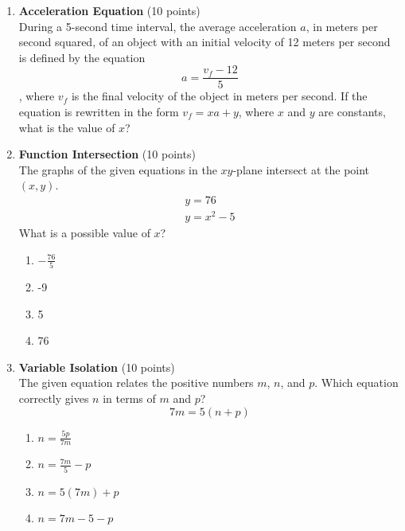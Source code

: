 \begin{enumerate}
  \item \textbf{Acceleration Equation} (10 points)\\
  During a 5-second time interval, the average acceleration $a$, in 
  meters per second squared, of an object with an initial velocity 
  of 12 meters per second is defined by the equation $$a=\frac{v_{f}-12}{5}$$, 
  where $v_f$ is the final velocity of the object in meters per second. If 
  the equation is rewritten in the form $v_f=x a+y$, where $x$ and $y$ are 
  constants, what is the value of $x$?
  \begin{subanswer}
  \end{subanswer}

  \newpage

  \item \textbf{Function Intersection} (10 points)\\
  The graphs of the given equations in the $xy$-plane intersect at the point $(x, y)$.
  \[
  \begin{gathered}
  y=76 \\
  y=x^{2}-5
  \end{gathered}
  \]
  What is a possible value of $x$?
  \begin{enumerate}[label=(\Alph*)]
    \item $-\frac{76}{5}$
    \item -9
    \item 5
    \item 76
  \end{enumerate}
  \begin{subanswer}
  \end{subanswer}

  \item \textbf{Variable Isolation} (10 points)\\
  The given equation relates the positive numbers $m$, $n$, and $p$. Which equation correctly gives $n$ in terms of $m$ and $p$?
  \[
  7 m=5(n+p)
  \]
  \begin{enumerate}[label=(\Alph*)]
    \item $n=\frac{5 p}{7 m}$
    \item $n=\frac{7 m}{5}-p$
    \item $n=5(7 m)+p$
    \item $n=7 m-5-p$
  \end{enumerate}
  \begin{subanswer}
  \end{subanswer}


\end{enumerate}
